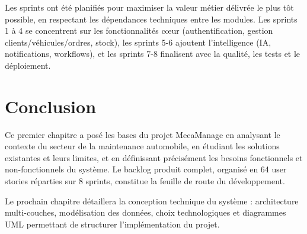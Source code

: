 Les sprints ont été planifiés pour maximiser la valeur métier délivrée le plus tôt possible, en respectant les dépendances techniques entre les modules. Les sprints 1 à 4 se concentrent sur les fonctionnalités cœur (authentification, gestion clients/véhicules/ordres, stock), les sprints 5-6 ajoutent l'intelligence (IA, notifications, workflows), et les sprints 7-8 finalisent avec la qualité, les tests et le déploiement.

\section{Conclusion}

Ce premier chapitre a posé les bases du projet MecaManage en analysant le contexte du secteur de la maintenance automobile, en étudiant les solutions existantes et leurs limites, et en définissant précisément les besoins fonctionnels et non-fonctionnels du système. Le backlog produit complet, organisé en 64 user stories réparties sur 8 sprints, constitue la feuille de route du développement.

Le prochain chapitre détaillera la conception technique du système : architecture multi-couches, modélisation des données, choix technologiques et diagrammes UML permettant de structurer l'implémentation du projet.